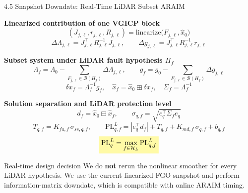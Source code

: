 \documentclass[10pt,aspectratio=169,xcolor=dvipsnames]{beamer}
\newcommand{\PL}{\mathrm{PL}}
\newcommand{\1}{\mathbb{1}}
\newcommand{\hlb}[1]{\colorbox{yellow!35}{\(\displaystyle #1\)}}
\begin{document}
\begin{frame}[t]{4.5 Snapshot Downdate: Real-Time LiDAR Subset ARAIM}
  \tiny
  \vspace{-2pt}
  \setlength{\abovedisplayskip}{2pt}
  \setlength{\belowdisplayskip}{2pt}
  \setlength{\abovedisplayshortskip}{1pt}
  \setlength{\belowdisplayshortskip}{1pt}
  \setlength{\jot}{0pt}

  \textbf{Linearized contribution of one VGICP block}
  \[
    (J_{j,\ell}, r_{j,\ell}, R_{j,\ell})=\mathrm{linearize}\bigl(F_{j,\ell},\hat{x}_0\bigr)
  \]
  \[
    \Delta\Lambda_{j,\ell}=J_{j,\ell}^{\top}R_{j,\ell}^{-1}J_{j,\ell},
    \qquad
    \Delta g_{j,\ell}=J_{j,\ell}^{\top}R_{j,\ell}^{-1}r_{j,\ell}
  \]

  \vspace{1pt}
  \textbf{Subset system under LiDAR fault hypothesis \(H_f\)}
  \[
    \Lambda_f=\Lambda_0-\sum_{F_{j,\ell}\in\mathcal{B}(H_f)}\Delta\Lambda_{j,\ell},
    \qquad
    g_f=g_0-\sum_{F_{j,\ell}\in\mathcal{B}(H_f)}\Delta g_{j,\ell}
  \]
  \[
    \delta x_f=\Lambda_f^{-1}g_f,\quad
    \hat{x}_f=\hat{x}_0\boxplus\delta x_f,\quad
    \Sigma_f=\Lambda_f^{-1}
  \]

  \vspace{1pt}
  \textbf{Solution separation and LiDAR protection level}
  \[
    d_f=\hat{x}_0\boxminus\hat{x}_f,\qquad
    \sigma_{q,f}=\sqrt{e_q^\top \Sigma_f e_q}
  \]
  \[
    T_{q,f}=K_{fa,f}\,\sigma_{ss,q,f},
    \qquad
    \PL^{L}_{q,f}=|e_q^\top d_f|+T_{q,f}+K_{md,f}\,\sigma_{q,f}+b_{q,f}
  \]
  \[
    \hlb{
      \PL^{L}_{q}=\max_{f\in\mathcal{H}_L}\PL^{L}_{q,f}
    }
  \]

  \vspace{-2pt}
  \begin{block}{\scriptsize Real-time design decision}
    \fontsize{5.7pt}{6.2pt}\selectfont
    We do \textbf{not} rerun the nonlinear smoother for every LiDAR hypothesis.
    We use the current linearized FGO snapshot and perform information-matrix
    downdate, which is compatible with online ARAIM timing.
  \end{block}
\end{frame}
\end{document}
